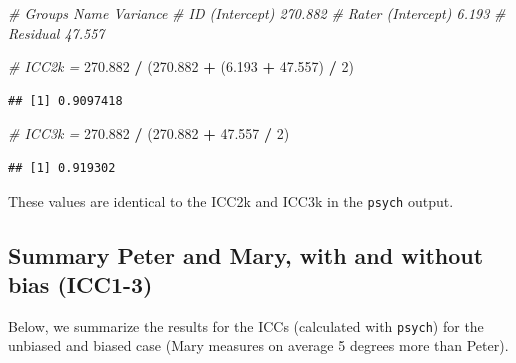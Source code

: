 \documentclass[
]{book}
\newenvironment{Shaded}{\begin{snugshade}}{\end{snugshade}}
\newcommand{\CommentTok}[1]{\textcolor[rgb]{0.56,0.35,0.01}{\textit{#1}}}
\newcommand{\DecValTok}[1]{\textcolor[rgb]{0.00,0.00,0.81}{#1}}
\newcommand{\FloatTok}[1]{\textcolor[rgb]{0.00,0.00,0.81}{#1}}
\newcommand{\NormalTok}[1]{#1}
\newcommand{\SpecialCharTok}[1]{\textcolor[rgb]{0.81,0.36,0.00}{\textbf{#1}}}
\begin{document}
\begin{Shaded}
\begin{Highlighting}[]
\CommentTok{\# Groups   Name        Variance}
\CommentTok{\# ID       (Intercept) 270.882 }
\CommentTok{\# Rater    (Intercept)   6.193 }
\CommentTok{\# Residual              47.557 }

\CommentTok{\# ICC2k =}
\FloatTok{270.882} \SpecialCharTok{/}\NormalTok{ (}\FloatTok{270.882} \SpecialCharTok{+}\NormalTok{ (}\FloatTok{6.193} \SpecialCharTok{+} \FloatTok{47.557}\NormalTok{) }\SpecialCharTok{/} \DecValTok{2}\NormalTok{)}
\end{Highlighting}
\end{Shaded}

\begin{verbatim}
## [1] 0.9097418
\end{verbatim}

\begin{Shaded}
\begin{Highlighting}[]
\CommentTok{\# ICC3k =}
\FloatTok{270.882} \SpecialCharTok{/}\NormalTok{ (}\FloatTok{270.882} \SpecialCharTok{+} \FloatTok{47.557} \SpecialCharTok{/} \DecValTok{2}\NormalTok{)}
\end{Highlighting}
\end{Shaded}

\begin{verbatim}
## [1] 0.919302
\end{verbatim}

These values are identical to the ICC2k and ICC3k in the \texttt{psych} output.

\subsection{Summary Peter and Mary, with and without bias (ICC1-3)}\label{summary-peter-and-mary-with-and-without-bias-icc1-3}

Below, we summarize the results for the ICCs (calculated with \texttt{psych})
for the unbiased and biased case (Mary measures on average 5 degrees more than Peter).
\end{document}
